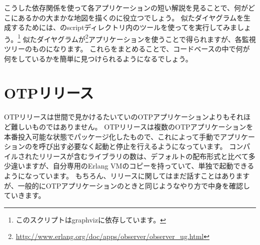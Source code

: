 こうした依存関係を使って各アプリケーションの短い解説を見ることで、何がどこにあるかの大まかな地図を描くのに役立つでしょう。
似たダイヤグラムを生成するためには、のscriptディレクトリ内のツールを使ってを実行してみましょう。\footnote{このスクリプトはgraphvizに依存しています。}
似たダイヤグラムが\footnote{\href{http://www.erlang.org/doc/apps/observer/observer\_ug.html}{http://www.erlang.org/doc/apps/observer/observer\_ug.html}}アプリケーションを使うことで得られますが、各監視ツリーのものになります。
これらをまとめることで、コードベースの中で何が何をしているかを簡単に見つけられるようになるでしょう。

\FloatBarrier

\section{OTPリリース}
\label{sec:dive-otp-releases}

OTPリリースは世間で見かけるたいていのOTPアプリケーションよりもそれほど難しいものではありません。
OTPリリースは複数のOTPアプリケーションを本番投入可能な状態でパッケージ化したもので、これによって手動でアプリケーションのを呼び出す必要なく起動と停止を行えるようになっています。
コンパイルされたリリースが含むライブラリの数は、デフォルトの配布形式と比べて多少違いますが、自分専用のErlang VMのコピーを持っていて、単独で起動できるようになっています。
もちろん、リリースに関してはまだ話すことはありますが、一般的にOTPアプリケーションのときと同じようなやり方で中身を確認していきます。

